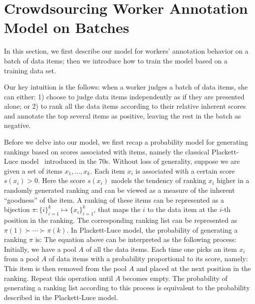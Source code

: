 
\section{Crowdsourcing Worker Annotation Model on Batches}
\label{sec:worker}

In this section, we first describe our model for workers' annotation behavior 
on a batch of data items;
then we introduce how to train the model based on a training data set.

Our key intuition is the follows:
when a worker judges a batch of data items,
she can either:
1) choose to judge data items independently as if they are presented alone; or
2) to rank all the data items according to their relative inherent scores
and annotate the top several items as positive, leaving the rest in the batch as negative.

%

Before we delve into our model, we first recap a probability model for generating rankings
based on scores associated with items, 
namely the classical Plackett-Luce model~\cite{luce:2005, plackett:1975} introduced in the 70s.
Without loss of generality, suppose we are given a set of items $x_1, \ldots, x_k$.
Each item $x_i$ is associated with a certain score $s(x_i) > 0$.  %
Here the score $s(x_i)$ models the tendency of ranking 
$x_i$ higher in a randomly generated ranking and 
can be viewed as a measure of the inherent ``goodness'' of the item.
A ranking of these items can be represented as a bijection $\pi : \{i\}_{i = 1}^k \mapsto \{x_i\}_{i = 1}^k$,
that maps the $i$ to the data item at the $i$-th position in the ranking.
The corresponding ranking list can be represented as
$\pi(1) \succ \cdots \succ \pi(k)$.
In Plackett-Luce model, the probability of generating a ranking $\pi$ is:
%
The equation above can be interpreted as the following process:
Initially, we have a pool $A$ of all the data items.
Each time one picks an item $x_i$ from a pool $A$ of data 
items with a probability proportional to its score, namely:
This item is then removed from the pool $A$ and placed at the next position in the ranking.
Repeat this operation until $A$ becomes empty.
The probability of generating a ranking list according to this process is equivalent to the probability described in the Plackett-Luce model.

